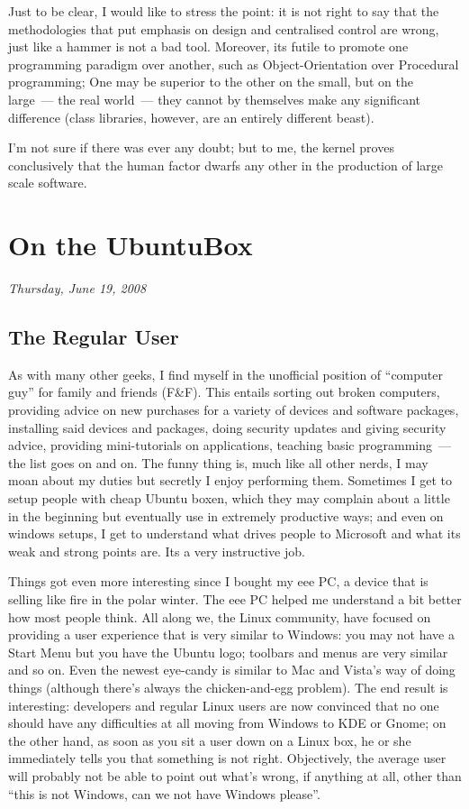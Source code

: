 \documentclass{memoir}
\begin{document}
Just to be clear, I would like to stress the point: it is not right to
say that the methodologies that put emphasis on design and centralised
control are wrong, just like a hammer is not a bad tool. Moreover, its
futile to promote one programming paradigm over another, such as
Object-Orientation over Procedural programming; One may be superior to
the other on the small, but on the large~--- the real world~--- they
cannot by themselves make any significant difference (class libraries,
however, are an entirely different beast).

I'm not sure if there was ever any doubt; but to me, the kernel proves
conclusively that the human factor dwarfs any other in the production
of large scale software.

\chapter{On the UbuntuBox}

\begin{flushright}
  \emph{Thursday, June 19, 2008}
\end{flushright}

\section{The Regular User}

As with many other geeks, I find myself in the unofficial position of
``computer guy'' for family and friends (F\&F). This entails sorting out
broken computers, providing advice on new purchases for a variety of
devices and software packages, installing said devices and packages,
doing security updates and giving security advice, providing
mini-tutorials on applications, teaching basic programming~--- the list
goes on and on. The funny thing is, much like all other nerds, I may
moan about my duties but secretly I enjoy performing them. Sometimes I
get to setup people with cheap Ubuntu boxen, which they may complain
about a little in the beginning but eventually use in extremely
productive ways; and even on windows setups, I get to understand what
drives people to Microsoft and what its weak and strong points
are. Its a very instructive job.

Things got even more interesting since I bought my eee PC, a device
that is selling like fire in the polar winter. The eee PC helped me
understand a bit better how most people think. All along we, the Linux
community, have focused on providing a user experience that is very
similar to Windows: you may not have a Start Menu but you have the
Ubuntu logo; toolbars and menus are very similar and so on. Even the
newest eye-candy is similar to Mac and Vista's way of doing things
(although there's always the chicken-and-egg problem). The end result
is interesting: developers and regular Linux users are now convinced
that no one should have any difficulties at all moving from Windows to
KDE or Gnome; on the other hand, as soon as you sit a user down on a
Linux box, he or she immediately tells you that something is not
right. Objectively, the average user will probably not be able to
point out what's wrong, if anything at all, other than ``this is not
Windows, can we not have Windows please''.
\end{document}
